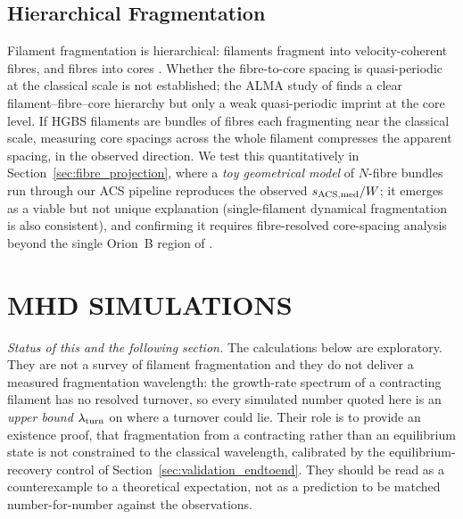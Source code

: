 \documentclass[usenatbib,twoside,twocolumn]{mnras}
\begin{document}
\subsection{Hierarchical Fragmentation}

Filament fragmentation is hierarchical: filaments fragment into velocity-coherent fibres, and fibres into cores \citep{Hacar2013,Hacar2018,Yang2024}. Whether the fibre-to-core spacing is quasi-periodic at the classical scale is not established; the ALMA study of \citet{Yang2024} finds a clear filament--fibre--core hierarchy but only a weak quasi-periodic imprint at the core level. If HGBS filaments are bundles of fibres each fragmenting near the classical scale, measuring core spacings across the whole filament compresses the apparent spacing, in the observed direction. We test this quantitatively in Section~\ref{sec:fibre_projection}, where a \emph{toy geometrical model} of $N$-fibre bundles run through our ACS pipeline reproduces the observed $s_{\rm ACS,med}/W$; it emerges as a viable but not unique explanation (single-filament dynamical fragmentation is also consistent), and confirming it requires fibre-resolved core-spacing analysis beyond the single Orion~B region of \citet{Yang2024}.

\section{MHD SIMULATIONS}
\label{sec:sims}

\noindent\emph{Status of this and the following section.} The calculations below are exploratory. They are not a survey of filament fragmentation and they do not deliver a measured fragmentation wavelength: the growth-rate spectrum of a contracting filament has no resolved turnover, so every simulated number quoted here is an \emph{upper bound} $\lambda_{\rm turn}$ on where a turnover could lie. Their role is to provide an existence proof, that fragmentation from a contracting rather than an equilibrium state is not constrained to the classical wavelength, calibrated by the equilibrium-recovery control of Section~\ref{sec:validation_endtoend}. They should be read as a counterexample to a theoretical expectation, not as a prediction to be matched number-for-number against the observations.
\end{document}
